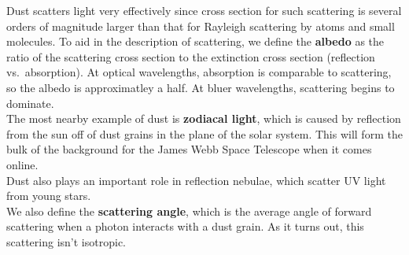 \documentclass[10pt]{article}
\numberwithin{equation}{section}
\newcommand{\n}{\noindent}
\begin{document}
\n Dust scatters light very effectively since cross section for such scattering
is several orders of magnitude larger than that for Rayleigh scattering by
atoms and small molecules. To aid in the description of scattering, we define
the \textbf{albedo} as the ratio of the scattering cross section to the
extinction cross section (reflection vs.\ absorption). At optical wavelengths, 
absorption is comparable to scattering, so the albedo is approximatley a half.
At bluer wavelengths, scattering begins to dominate.\\

\n The most nearby example of dust is \textbf{zodiacal light}, which is caused
by reflection from the sun off of dust grains in the plane of the solar system.
This will form the bulk of the background for the James Webb Space Telescope
when it comes online.\\

\n Dust also plays an important role in reflection nebulae, which scatter UV
light from young stars.\\

\n We also define the \textbf{scattering angle}, which is the average angle of
forward scattering when a photon interacts with a dust grain. As it turns out,
this scattering isn't isotropic.
\end{document}
